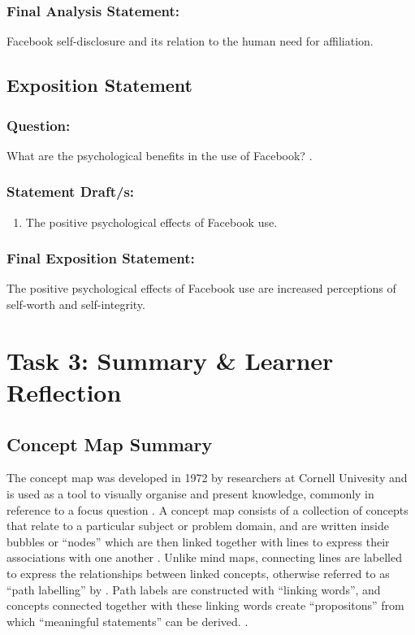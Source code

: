 \documentclass[12pt,a4paper]{report}
\begin{document}
\subsubsection*{\textsf{Final Analysis Statement:}}
Facebook self-disclosure and its relation to the human need for affiliation.

\subsection*{\textsf{Exposition Statement}}

\subsubsection*{\textsf{Question:}}
What are the psychological benefits in the use of Facebook? \citep{Toma2013}.

\subsubsection*{\textsf{Statement Draft/s:}}
\begin{enumerate}
\item The positive psychological effects of Facebook use.
\end{enumerate}

\subsubsection*{\textsf{Final Exposition Statement:}}
The positive psychological effects of Facebook use are increased perceptions of self-worth and self-integrity.

\newpage
\section*{\textsf{Task 3: Summary \& Learner Reflection}}

\subsection*{\textsf{Concept Map Summary}}

The concept map was developed in 1972 by researchers at Cornell Univesity and is used as a tool to visually organise and present knowledge, commonly in reference to a focus question \citep{Novak2006}. A concept map consists of a collection of concepts that relate to a particular subject or problem domain, and are written inside bubbles or ``nodes'' which are then linked together with lines to express their associations with one another \citep{Novak2006}. Unlike mind maps, connecting lines are labelled to express the relationships between linked concepts, otherwise referred to as ``path labelling'' by \citet[p. 790]{Rodriguez-Priego2013}. Path labels are constructed with ``linking words'', and concepts connected together with these linking words create ``propositons'' from which ``meaningful statements'' can be derived. \citep[p. 1]{Novak2006}.\\
\end{document}
